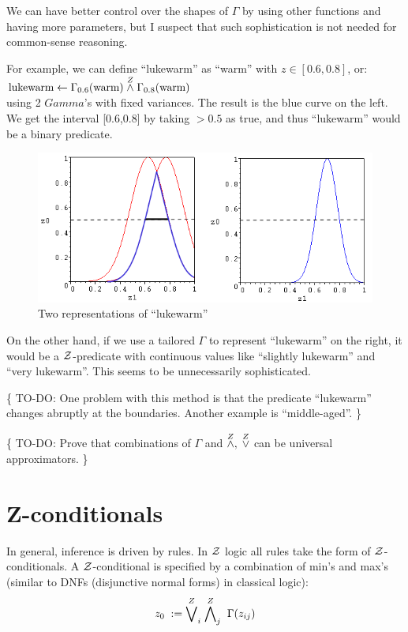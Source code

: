 We can have better control over the shapes of $\Gamma$ by using other functions and having more parameters, but I suspect that such sophistication is not needed for common-sense reasoning.

For example, we can define ``lukewarm'' as ``warm'' with $z \in [0.6,0.8]$, or:\\
\hspace*{1cm} $\mbox{lukewarm} \leftarrow \Gamma_{0.6}(\mbox{warm}) \stackrel{Z}{\wedge} \Gamma_{0.8}(\mbox{warm})$\\
using 2 $Gamma$'s with fixed variances.  The result is the blue curve on the left.  We get the interval [0.6,0.8] by taking $> 0.5$ as true, and thus ``lukewarm'' would be a binary predicate.
\begin{figure}[H]
\centering
\includegraphics[scale=0.9]{Gamma-for-lukewarm.png}
\caption{Two representations of ``lukewarm''}
\end{figure}
On the other hand, if we use a tailored $\Gamma$ to represent ``lukewarm'' on the right, it would be a $\mathcal{Z}$-predicate with continuous values like ``slightly lukewarm'' and ``very lukewarm''.  This seems to be unnecessarily sophisticated.

\{ TO-DO:  One problem with this method is that the predicate ``lukewarm'' changes abruptly at the boundaries.  Another example is ``middle-aged''.  \}

\{ TO-DO:  Prove that combinations of $\Gamma$ and $\stackrel{Z}{\wedge} ,\; \stackrel{Z}{\vee}$ can be universal approximators. \}

\section{Z-conditionals}
\label{sec:Z-conditionals}

In general, inference is driven by rules.  In $\mathcal{Z}$ logic all rules take the form of $\mathcal{Z}$-conditionals.  A $\mathcal{Z}$-conditional is specified by a combination of min's and max's (similar to DNFs (disjunctive normal forms) in classical logic):
\begin{equation}
z_0 \; := \; \stackrel{Z}{\bigvee}_i \; \stackrel{Z}{\bigwedge}_j \; \Gamma(z_{ij})
\end{equation}

